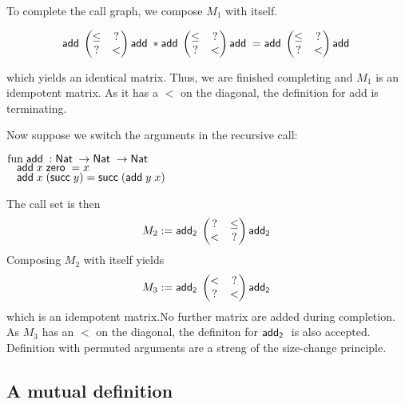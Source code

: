 To complete the call graph, we compose $M_1$ with itself.

\[
\mathsf{add}\;\begin{pmatrix}
\leq & ? \\
?    & < \\
\end{pmatrix}\mathsf{add}\;
* 
\mathsf{add}\;\begin{pmatrix}
\leq & ? \\
?    & < \\
\end{pmatrix}\mathsf{add}\;
=
\mathsf{add}\;\begin{pmatrix}
\leq & ? \\
?    & < \\
\end{pmatrix}\mathsf{add}\;
\]

which yields an identical matrix.
Thus, we are finished completing and $M_1$ is an idempotent matrix.
As it has a $<$ on the diagonal, the definition for add is terminating.

Now suppose we switch the arguments in the recursive call:
\begin{bsp}
$\mathrm{fun}\; \mathsf{add}\; : \mathsf{Nat}\; \rightarrow \mathsf{Nat}\; \rightarrow \mathsf{Nat}\;$\\
$\hspace*{3mm} \mathsf{add}\; x \; \mathsf{zero}\; = x $\\
$\hspace*{3mm} \mathsf{add}\; x \; (\mathsf{succ}\; y) = \mathsf{succ}\; (\mathsf{add}\; y \; x)  $
\end{bsp}

The call set is then 
\[
M_2 := \mathsf{add_2}\;\begin{pmatrix}

? & \leq \\
< & ?   \\
\end{pmatrix}\mathsf{add_2}\;
\]
Composing $M_2$ with itself yields
\[
M_3 := \mathsf{add_2}\; \begin{pmatrix}
< & ?    \\
? & <    \\
\end{pmatrix} \mathsf{add_2}\;
\] 
which is an idempotent matrix.No further matrix are added during completion.
As $M_3$ has an $<$ on the diagonal, the definiton for $\mathsf{add_2}\;$ is also accepted.
Definition with permuted arguments are a streng of the size-change principle.  

\subsection{A mutual definition}

